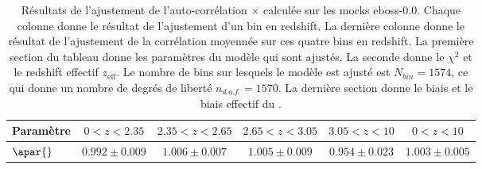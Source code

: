 \begin{table}[h]
  \centering
  \caption{Résultats de l'ajustement de l'auto-corrélation \lya{}$\times$\lya{} calculée sur les mocks eboss-0.0. Chaque colonne donne le résultat de l'ajustement d'un bin en redshift. La dernière colonne donne le résultat de l'ajustement de la corrélation moyennée sur ces quatre bins en redshift. La première section du tableau donne les paramètres du modèle qui sont ajustés. La seconde donne le $\chi^2$ et le redshift effectif $z_{\mathrm{eff}}$. Le nombre de bins sur lesquels le modèle est ajusté est $N_{bin} = \num{1574}$, ce qui donne un nombre de degrés de liberté $n_{d.o.f.} = \num{1570}$. La dernière section donne le biais et le biais effectif du \lya{}.}
  \label{tab:cf_eboss00_4bins}
  \footnotesize
  \begin{tabular}{lccccc}
    \toprule
    Param\`etre  & $\num{0} < z < \num{2.35}$ & $\num{2.35} < z < \num{2.65}$ & $\num{2.65} < z < \num{3.05}$ & $\num{3.05} < z < \num{10}$  & $\num{0} < z < \num{10}$ \\
    \midrule
    $\apar{} $ & $ 0.992 \pm 0.009$ & $ 1.006 \pm 0.007$ & $ 1.005 \pm 0.009$ & $ 0.954 \pm 0.023$ & $ 1.003 \pm 0.005$ \\

\end{tabular}
\end{table}
